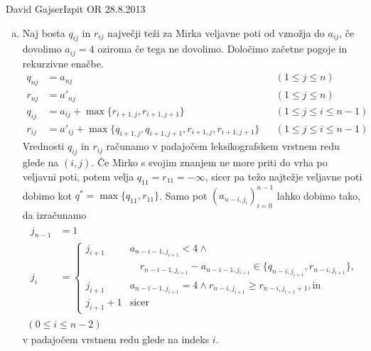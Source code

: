 \begin{naloga}{David Gajser}{Izpit OR 28.8.2013}
\begin{odgovor}
\begin{enumerate}[(a)]
\item Naj bosta $q_{ij}$ in $r_{ij}$
največji teži za Mirka veljavne poti od vznožja do $a_{ij}$,
če dovolimo $a_{ij} = 4$ oziroma če tega ne dovolimo.
Določimo začetne pogoje in rekurzivne enačbe.
\begin{align*}
q_{nj} &= a_{nj} && (1 \le j \le n) \\
r_{nj} &= a'_{nj} && (1 \le j \le n) \\
q_{ij} &= a_{ij} + \max\{r_{i+1,j}, r_{i+1,j+1}\} && (1 \le j \le i \le n-1) \\
r_{ij} &= a'_{ij} + \max\{q_{i+1,j}, q_{i+1,j+1}, r_{i+1,j}, r_{i+1,j+1}\}
&& (1 \le j \le i \le n-1)
\end{align*}
Vrednosti $q_{ij}$ in $r_{ij}$ računamo
v padajočem leksikografskem vrstnem redu glede na $(i, j)$.
Če Mirko s svojim znanjem ne more priti do vrha po veljavni poti,
potem velja $q_{11} = r_{11} = -\infty$,
sicer pa težo najtežje veljavne poti
dobimo kot $q^* = \max\{q_{11}, r_{11}\}$.
Samo pot $(a_{n-i, j_i})_{i=0}^{n-1}$ lahko dobimo tako,
da izračunamo
\begin{multline*}
\begin{aligned}
j_{n-1} &= 1 \\
j_i &= \begin{cases}
j_{i+1} & a_{n-i-1,j_{i+1}} < 4 \land {} \\[-1mm]
&\quad r_{n-i-1,j_{i+1}} - a_{n-i-1,j_{i+1}} \in \{q_{n-i,j_{i+1}}, r_{n-i,j_{i+1}}\}, \\
j_{i+1} & a_{n-i-1,j_{i+1}} = 4 \land r_{n-i,j_{i+1}} \ge r_{n-i,j_{i+1}+1},
\text{in} \\
j_{i+1} + 1 & \text{sicer}
\end{cases}
\end{aligned} \\
(0 \le i \le n-2)
\end{multline*}
v padajočem vrstnem redu glede na indeks $i$.
\end{enumerate}
\end{odgovor}
\end{naloga}
